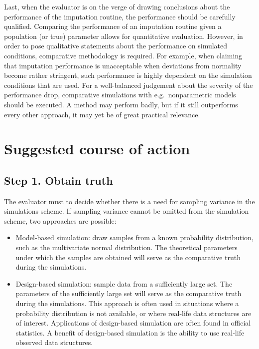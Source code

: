 \documentclass[
]{article}
\providecommand{\tightlist}{%
  \setlength{\itemsep}{0pt}\setlength{\parskip}{0pt}}
\begin{document}
Last, when the evaluator is on the verge of drawing conclusions about
the performance of the imputation routine, the performance should be
carefully qualified. Comparing the performance of an imputation routine
given a population (or true) parameter allows for quantitative
evaluation. However, in order to pose qualitative statements about the
performance on simulated conditions, comparative methodology is
required. For example, when claiming that imputation performance is
unacceptable when deviations from normality become rather stringent,
such performance is highly dependent on the simulation conditions that
are used. For a well-balanced judgement about the severity of the
performance drop, comparative simulations with e.g.~nonparametric models
should be executed. A method may perform badly, but if it still
outperforms every other approach, it may yet be of great practical
relevance.

\hypertarget{suggested-course-of-action}{%
\section{Suggested course of action}\label{suggested-course-of-action}}

\hypertarget{step-1.-obtain-truth}{%
\subsection{Step 1. Obtain truth}\label{step-1.-obtain-truth}}

The evaluator must to decide whether there is a need for sampling
variance in the simulations scheme. If sampling variance cannot be
omitted from the simulation scheme, two approaches are possible:

\begin{itemize}
\tightlist
\item
  Model-based simulation: draw samples from a known probability
  distribution, such as the multivariate normal distribution. The
  theoretical parameters under which the samples are obtained will serve
  as the comparative truth during the simulations.
\item
  Design-based simulation: sample data from a sufficiently large set.
  The parameters of the sufficiently large set will serve as the
  comparative truth during the simulations. This approach is often used
  in situations where a probability distribution is not available, or
  where real-life data structures are of interest. Applications of
  design-based simulation are often found in official statistics. A
  benefit of design-based simulation is the ability to use real-life
  observed data structures.
\end{itemize}
\end{document}

